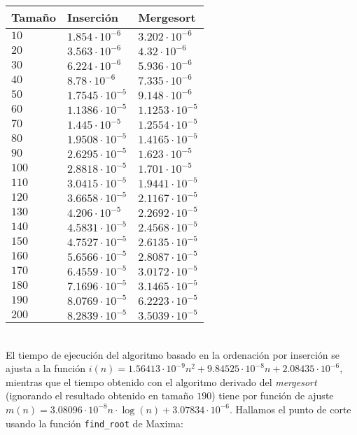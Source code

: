 \begin{tabular}{|l|l|l|}
	\hline
	Tamaño & Inserción & Mergesort \\
	\hline
	$10 $ & $1.854\cdot 10^{-6} $ & $3.202\cdot 10^{-6} $ \\ \hline
	$20 $ & $3.563\cdot 10^{-6} $ & $4.32\cdot 10^{-6}  $ \\ \hline
	$30 $ & $6.224\cdot 10^{-6} $ & $5.936\cdot 10^{-6} $ \\ \hline
	$40 $ & $8.78\cdot 10^{-6}  $ & $7.335\cdot 10^{-6} $ \\ \hline
	$50 $ & $1.7545\cdot 10^{-5}$ & $9.148\cdot 10^{-6} $ \\ \hline
	$60 $ & $1.1386\cdot 10^{-5}$ & $1.1253\cdot 10^{-5}$ \\ \hline
	$70 $ & $1.445\cdot 10^{-5} $ & $1.2554\cdot 10^{-5}$ \\ \hline
	$80 $ & $1.9508\cdot 10^{-5}$ & $1.4165\cdot 10^{-5}$ \\ \hline
	$90 $ & $2.6295\cdot 10^{-5}$ & $1.623\cdot 10^{-5} $ \\ \hline
	$100$ & $2.8818\cdot 10^{-5}$ & $1.701\cdot 10^{-5} $ \\ \hline
	$110$ & $3.0415\cdot 10^{-5}$ & $1.9441\cdot 10^{-5}$ \\ \hline
	$120$ & $3.6658\cdot 10^{-5}$ & $2.1167\cdot 10^{-5}$ \\ \hline
	$130$ & $4.206\cdot 10^{-5} $ & $2.2692\cdot 10^{-5}$ \\ \hline
	$140$ & $4.5831\cdot 10^{-5}$ & $2.4568\cdot 10^{-5}$ \\ \hline
	$150$ & $4.7527\cdot 10^{-5}$ & $2.6135\cdot 10^{-5}$ \\ \hline
	$160$ & $5.6566\cdot 10^{-5}$ & $2.8087\cdot 10^{-5}$ \\ \hline
	$170$ & $6.4559\cdot 10^{-5}$ & $3.0172\cdot 10^{-5}$ \\ \hline
	$180$ & $7.1696\cdot 10^{-5}$ & $3.1465\cdot 10^{-5}$ \\ \hline
	$190$ & $8.0769\cdot 10^{-5}$ & $6.2223\cdot 10^{-5}$ \\ \hline
	$200$ & $8.2839\cdot 10^{-5}$ & $3.5039\cdot 10^{-5}$ \\ \hline
\end{tabular} \\

El tiempo de ejecución del algoritmo basado en la ordenación por inserción se ajusta a la función $i(n) = 1.56413 \cdot 10^{-9} n^2 + 9.84525 \cdot 10^{-8} n + 2.08435 \cdot 10^{-6}$, mientras que el tiempo obtenido con el algoritmo derivado del \textit{mergesort} (ignorando el resultado obtenido en tamaño $190$) tiene por función de ajuste $m(n) = 3.08096 \cdot 10^{-8} n \cdot \log(n) + 3.07834 \cdot 10^{-6}$. Hallamos el punto de corte usando la función \texttt{find\_root} de Maxima: 

